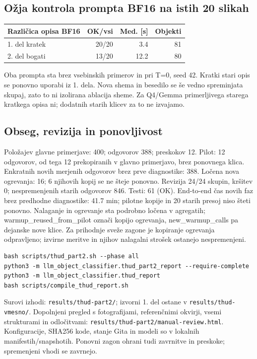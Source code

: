 \documentclass[10pt,a4paper]{article}
\begin{document}
\subsection*{Ožja kontrola prompta BF16 na istih 20 slikah}
\begin{center}\small\begin{tabular}{lrrr}\toprule
Različica opisa BF16 & OK/vsi & Med. [s] & Objekti \\ \midrule
1. del kratek & 20/20 & 3.4 & 81 \\
2. del bogati & 13/20 & 12.2 & 80 \\
\bottomrule\end{tabular}\end{center}

Oba prompta sta brez vsebinskih primerov in pri T=0, seed 42. Kratki stari opis se ponovno uporabi iz 1. dela. Nova shema in besedilo se še vedno spreminjata skupaj, zato to ni izolirana ablacija sheme. Za Q4/Gemma primerljivega starega kratkega opisa ni; dodatnih starih klicev za to ne izvajamo.
\subsection*{Obseg, revizija in ponovljivost}
Položajev glavne primerjave: 400; odgovorov 388; preskokov 12. Pilot: 12 odgovorov, od tega 12 prekopiranih v glavno primerjavo, brez ponovnega klica. Enkratnih novih merjenih odgovorov brez prve diagnostike: 388. Ločena nova ogrevanja: 16; 6 njihovih kopij se ne šteje ponovno. Revizija 24/24 skupin, kršitev 0; nespremenjenih starih odgovorov 846. Testi: 61 (OK).
End-to-end čas novih faz brez predhodne diagnostike: 41.7 min; pilotne kopije in 20 starih presoj niso šteti ponovno. Nalaganje in ogrevanje sta podrobno ločena v agregatih; warmup\_reused\_from\_pilot označi kopijo ogrevanja, new\_warmup\_calls pa dejanske nove klice. Za prihodnje sveže zagone je kopiranje ogrevanja odpravljeno; izvirne meritve in njihov nalagalni strošek ostanejo nespremenjeni.
\begin{verbatim}
bash scripts/thud_part2.sh --phase all
python3 -m llm_object_classifier.thud_part2_report --require-complete
python3 -m llm_object_classifier.thud_report
bash scripts/compile_thud_report.sh
\end{verbatim}
Surovi izhodi: \texttt{results/thud-part2/}; izvorni 1. del ostane v \texttt{results/thud-vmesno/}. Dopolnjeni pregled s fotografijami, referenčnimi okvirji, vsemi strukturami in odločitvami: \texttt{results/thud-part2/manual-review.html}. Konfiguracije, SHA256 kode, stanje Gita in modeli so v lokalnih manifestih/snapshotih. Ponovni zagon ohrani tudi zavrnitve in preskoke; spremenjeni vhodi se zavrnejo.
\end{document}
